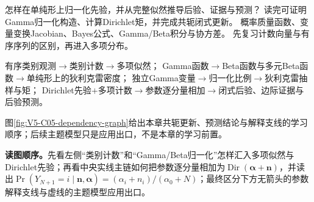\documentclass[UTF8,a4paper,11pt,openany]{ctexbook}
\begin{document}
\setcounter{page}{684}
\setcounter{chapter}{34}
\setcounter{figure}{0}
\pagestyle{headings}
{怎样在单纯形上归一化先验，并从完整似然推导后验、证据与预测？}
{读完可证明Gamma归一化构造、计算Dirichlet矩，并完成共轭闭式更新。}
{概率质量函数、变量变换Jacobian、Bayes公式、Gamma/Beta积分与协方差。}
{先复习计数向量与有序序列的区别，再进入多项分布。}
\begin{dependencybox}
有序类别观测$\to$类别计数$\to$多项似然；
Gamma函数$\to$Beta函数与多元Beta函数$\to$单纯形上的狄利克雷密度；
独立Gamma变量$\to$归一化比例$\to$狄利克雷抽样与矩；
Dirichlet先验$+$多项计数$\to$参数逐分量相加$\to$闭式后验、边际证据与后验预测。
\end{dependencybox}
图\ref{fig:V5-C05-dependency-graph}给出本章共轭更新、预测结论与解释支线的学习顺序；后续主题模型只是应用出口，不是本章的学习前置。

\FloatBarrier
\noindent\textbf{读图顺序。}先看左侧“类别计数”和“Gamma/Beta归一化”怎样汇入多项似然与Dirichlet先验；再看中央实线主链如何把参数逐分量相加为$\operatorname{Dir}(\boldsymbol\alpha+\boldsymbol n)$，并读出$\Pr(Y_{N+1}=i\mid\boldsymbol n,\boldsymbol\alpha)=(\alpha_i+n_i)/(\alpha_0+N)$；最终区分下方无箭头的参数解释支线与虚线的主题模型应用出口。\par
\end{document}
